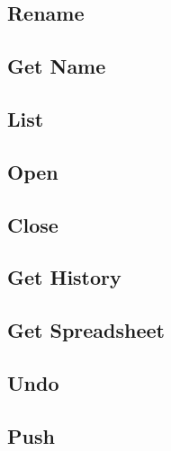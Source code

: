 \subsection{Rename}
\label{sec:message:rename}


\subsection{Get Name}
\label{sec:message:get_name}


\subsection{List}
\label{sec:message:list}


\subsection{Open}
\label{sec:message:open}


\subsection{Close}
\label{sec:message:close}


\subsection{Get History}
\label{sec:message:get_history}


\subsection{Get Spreadsheet}
\label{sec:message:get_spreadsheet}


\subsection{Undo}
\label{sec:message:undo}


\subsection{Push}
\label{sec:message:push}

